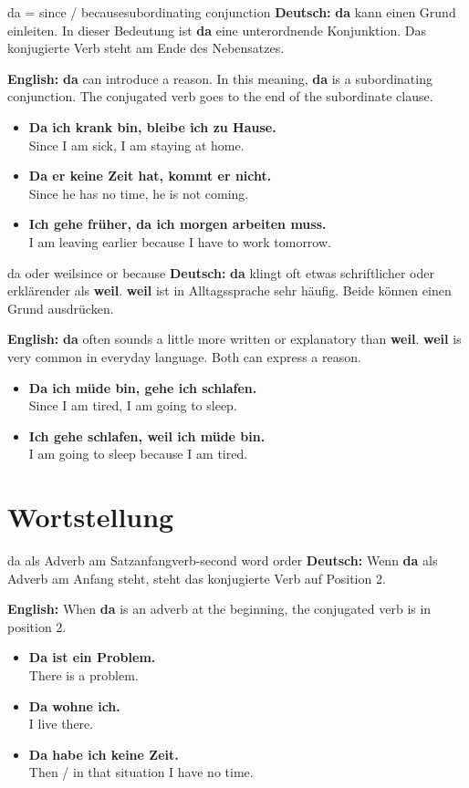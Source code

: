 \documentclass[a4paper,11pt]{article}
\newcommand{\GermanText}[1]{\textbf{Deutsch: }#1\par}
\newcommand{\EnglishText}[1]{{\small\color{SoftGray}\textbf{English: }#1\par}}
\newcommand{\ExampleItem}[2]{\item \textbf{#1}\\{\small\color{SoftGray}#2}}
\begin{document}
\begin{grammarentry}{da = since / because}{subordinating conjunction}
\GermanText{\textbf{da} kann einen Grund einleiten. In dieser Bedeutung ist \textbf{da} eine unterordnende Konjunktion. Das konjugierte Verb steht am Ende des Nebensatzes.}
\EnglishText{\textbf{da} can introduce a reason. In this meaning, \textbf{da} is a subordinating conjunction. The conjugated verb goes to the end of the subordinate clause.}

\begin{exbox}
\begin{itemize}
    \ExampleItem{Da ich krank bin, bleibe ich zu Hause.}{Since I am sick, I am staying at home.}
    \ExampleItem{Da er keine Zeit hat, kommt er nicht.}{Since he has no time, he is not coming.}
    \ExampleItem{Ich gehe früher, da ich morgen arbeiten muss.}{I am leaving earlier because I have to work tomorrow.}
\end{itemize}
\end{exbox}
\end{grammarentry}

\begin{grammarentry}{da oder weil}{since or because}
\GermanText{\textbf{da} klingt oft etwas schriftlicher oder erklärender als \textbf{weil}. \textbf{weil} ist in Alltagssprache sehr häufig. Beide können einen Grund ausdrücken.}
\EnglishText{\textbf{da} often sounds a little more written or explanatory than \textbf{weil}. \textbf{weil} is very common in everyday language. Both can express a reason.}

\begin{exbox}
\begin{itemize}
    \ExampleItem{Da ich müde bin, gehe ich schlafen.}{Since I am tired, I am going to sleep.}
    \ExampleItem{Ich gehe schlafen, weil ich müde bin.}{I am going to sleep because I am tired.}
\end{itemize}
\end{exbox}
\end{grammarentry}

\section{Wortstellung}

\begin{grammarentry}{da als Adverb am Satzanfang}{verb-second word order}
\GermanText{Wenn \textbf{da} als Adverb am Anfang steht, steht das konjugierte Verb auf Position 2.}
\EnglishText{When \textbf{da} is an adverb at the beginning, the conjugated verb is in position 2.}

\begin{exbox}
\begin{itemize}
    \ExampleItem{Da ist ein Problem.}{There is a problem.}
    \ExampleItem{Da wohne ich.}{I live there.}
    \ExampleItem{Da habe ich keine Zeit.}{Then / in that situation I have no time.}
\end{itemize}
\end{exbox}
\end{grammarentry}
\end{document}
